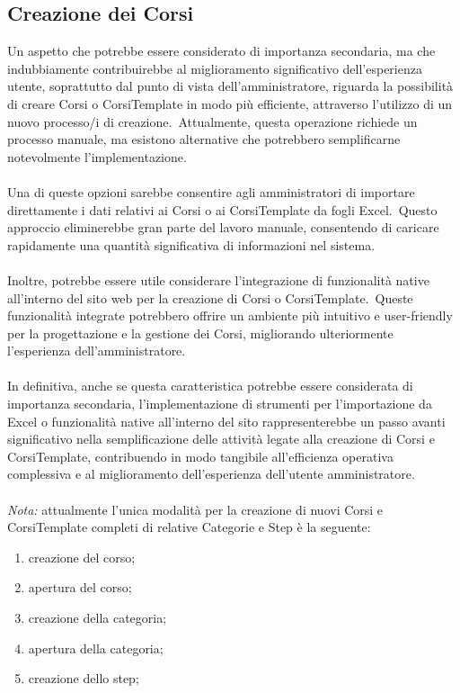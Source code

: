 \subsection{Creazione dei Corsi}\label{sec:cap_sec_subsec}
Un aspetto che potrebbe essere considerato di importanza secondaria, ma che indubbiamente contribuirebbe al miglioramento 
significativo dell'esperienza utente, soprattutto dal punto di vista dell'amministratore, 
riguarda la possibilità di creare Corsi o CorsiTemplate in modo più efficiente, attraverso l'utilizzo di un nuovo processo/i di creazione.\ 
Attualmente, questa operazione richiede un processo manuale, ma esistono alternative 
che potrebbero semplificarne notevolmente l'implementazione.
\\ \\
Una di queste opzioni sarebbe consentire agli amministratori di importare direttamente i dati relativi ai Corsi o ai CorsiTemplate 
da fogli Excel.\ Questo approccio eliminerebbe gran parte del lavoro manuale, 
consentendo di caricare rapidamente una quantità significativa di informazioni nel sistema.
\\ \\
Inoltre, potrebbe essere utile considerare l'integrazione di funzionalità native all'interno del sito web per la creazione 
di Corsi o CorsiTemplate.\ Queste funzionalità integrate potrebbero offrire un ambiente più intuitivo e user-friendly 
per la progettazione e la gestione dei Corsi, migliorando ulteriormente l'esperienza dell'amministratore.
\\ \\
In definitiva, anche se questa caratteristica potrebbe essere considerata di importanza secondaria, 
l'implementazione di strumenti per l'importazione da Excel o funzionalità native all'interno del sito 
rappresenterebbe un passo avanti significativo nella semplificazione delle attività legate alla creazione di Corsi e CorsiTemplate, 
contribuendo in modo tangibile all'efficienza operativa complessiva e al miglioramento dell'esperienza dell'utente amministratore. 
\\ \\
\textit{Nota: } attualmente l'unica modalità per la creazione di nuovi Corsi e CorsiTemplate completi di relative Categorie e Step è la seguente:
\begin{enumerate}
    \item creazione del corso;
    \item apertura del corso;
    \item creazione della categoria;
    \item apertura della categoria;
    \item creazione dello step;
\end{enumerate}
%
